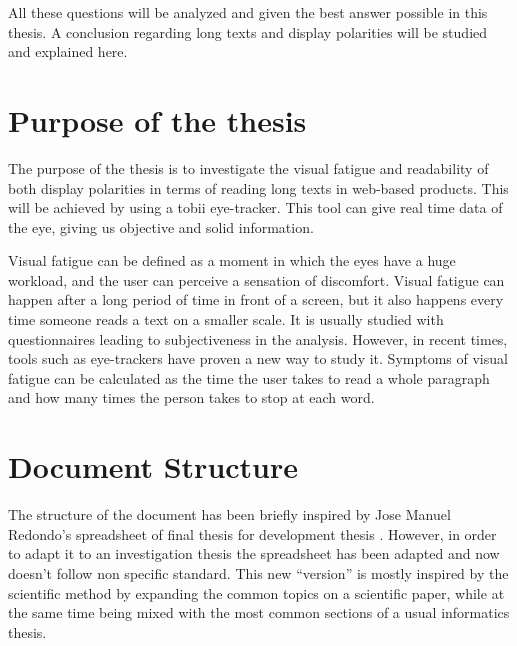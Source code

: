 All these questions will be analyzed and given the best answer possible in this thesis. 
A conclusion regarding long texts and display polarities will be studied and explained here.

\section{Purpose of the thesis}
The purpose of the thesis is to investigate the visual fatigue and readability of both display polarities in terms of reading 
long texts in web-based products. This will be achieved by using a tobii eye-tracker. This tool can give real time data of the 
eye, giving us objective and solid information.

Visual fatigue can be defined as a moment in which the eyes have a huge workload, and the user can perceive a sensation of discomfort\cite{visualFatigue}. 
Visual fatigue can happen after a long period of time in front of a screen, but it also happens every time someone reads a text on a 
smaller scale. It is usually studied with questionnaires leading to subjectiveness in the analysis. However, in recent times, tools 
such as eye-trackers have proven a new way to study it. Symptoms of visual fatigue can be calculated as the time the user takes to read 
a whole paragraph and how many times the person takes to stop at each word.

\section{Document Structure}
The structure of the document has been briefly inspired by Jose Manuel Redondo’s spreadsheet of final thesis for development thesis 
\cite{plantilla_tfg}. However, in order to adapt it to an investigation thesis the spreadsheet has been adapted and now doesn't follow non specific standard.
This new “version” is mostly inspired by the scientific method by expanding the common topics on a scientific paper, while at the same time being 
mixed with the most common sections of a usual informatics thesis.

